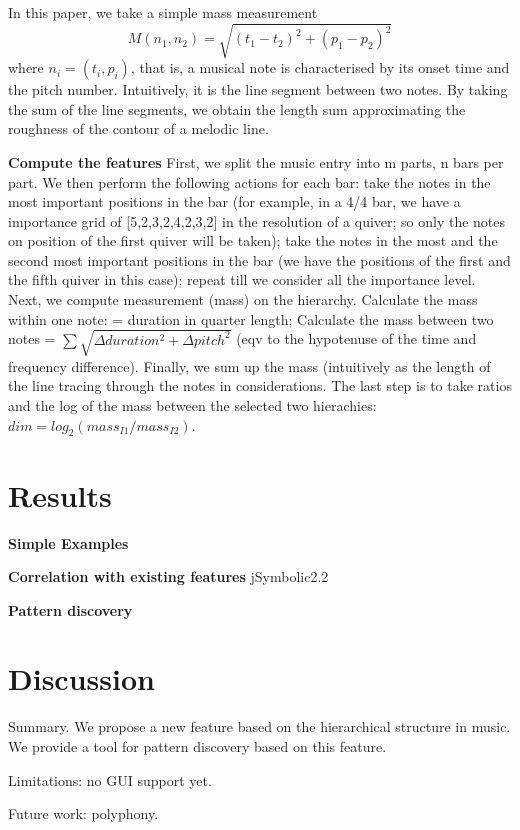In this paper, we take a simple mass measurement
$$M(n_1, n_2) = \sqrt{(t_1-t_2)^2 +(p_1-p_2)^2}$$
  where $n_i=(t_i, p_i)$, that is, a musical note is characterised by its onset time and the pitch number. 
Intuitively, it is the line segment between two notes.
By taking the sum of the line segments, we obtain the length sum approximating the roughness of the contour of a melodic line.

\textbf{Compute the features}
First, we split the music entry into m parts, n bars per part.
We then perform the following actions for each bar: take the notes in the most important positions in the bar (for example, in a 4/4 bar, we have a importance grid of [5,2,3,2,4,2,3,2] in the resolution of a quiver; so only the notes on position of the first quiver will be taken); take the notes in the most and the second most important positions in the bar (we have the positions of the first and the fifth quiver in this case); repeat till we consider all the importance level. Next, we compute measurement (mass) on the hierarchy. Calculate the mass within one note: = duration in quarter length; Calculate the mass between two notes =  $\sum \sqrt{\Delta duration^2 + \Delta pitch^2}$ (eqv to the hypotenuse of the time and frequency difference). Finally, we sum up the mass (intuitively as the length of the line tracing through the notes in considerations. The last step is to take ratios and the log of the mass between the selected two hierachies: $dim = log_2(mass_{I1}/mass_{I2})$.


\section{Results}

\textbf{Simple Examples}

\textbf{Correlation with existing features} jSymbolic2.2

\textbf{Pattern discovery}

\section{Discussion}
 
Summary. We propose a new feature based on the hierarchical structure in music. We provide a tool for pattern discovery based on this feature.

Limitations: no GUI support yet. 

Future work: polyphony. 

